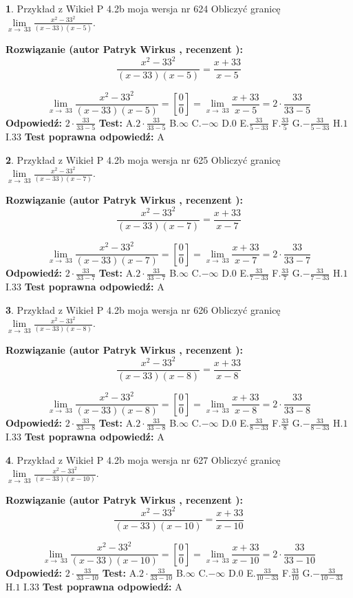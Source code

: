 \documentclass[12pt, a4paper]{article}
\theoremstyle{definition} %
\newtheorem{zad}{}
\newcommand{\zadStart}[1]{\begin{zad}#1\newline}
\newcommand{\zadStop}{\end{zad}}
\newcommand{\rozwStart}[2]{\noindent \textbf{Rozwiązanie (autor #1 , recenzent #2): }\newline}
\newcommand{\rozwStop}{\newline}
\newcommand{\odpStart}{\noindent \textbf{Odpowiedź:}\newline}
\newcommand{\odpStop}{\newline}
\newcommand{\testStart}{\noindent \textbf{Test:}\newline}
\newcommand{\testStop}{\newline}
\newcommand{\kluczStart}{\noindent \textbf{Test poprawna odpowiedź:}\newline}
\newcommand{\kluczStop}{\newline}
\begin{document}
\zadStart{Przykład z Wikieł P 4.2b moja wersja nr 624}
Obliczyć granicę $\lim\limits_{x\to\ 33}\frac{x^{2}-33^{2}}{(x-33)(x-5)}$.
\zadStop
\rozwStart{Patryk Wirkus}{}
$$\frac{x^{2}-33^{2}}{(x-33)(x-5)}=\frac{x+33}{x-5}$$

$$\lim\limits_{x\to\ 33}\frac{x^{2}-33^{2}}{(x-33)(x-5)}=[\frac{0}{0}]=\lim\limits_{x\to\ 33}\frac{x+33}{x-5}=2 \cdot \frac{33}{33-5}$$
\rozwStop
\odpStart
$2 \cdot \frac{33}{33-5}$
\odpStop
\testStart
A.$2 \cdot \frac{33}{33-5}$
B.$\infty$
C.$-\infty$
D.$0$
E.$\frac{33}{5-33}$
F.$\frac{33}{5}$
G.$-\frac{33}{5-33}$
H.$1$
I.$33$
\testStop
\kluczStart
A
\kluczStop



\zadStart{Przykład z Wikieł P 4.2b moja wersja nr 625}
Obliczyć granicę $\lim\limits_{x\to\ 33}\frac{x^{2}-33^{2}}{(x-33)(x-7)}$.
\zadStop
\rozwStart{Patryk Wirkus}{}
$$\frac{x^{2}-33^{2}}{(x-33)(x-7)}=\frac{x+33}{x-7}$$

$$\lim\limits_{x\to\ 33}\frac{x^{2}-33^{2}}{(x-33)(x-7)}=[\frac{0}{0}]=\lim\limits_{x\to\ 33}\frac{x+33}{x-7}=2 \cdot \frac{33}{33-7}$$
\rozwStop
\odpStart
$2 \cdot \frac{33}{33-7}$
\odpStop
\testStart
A.$2 \cdot \frac{33}{33-7}$
B.$\infty$
C.$-\infty$
D.$0$
E.$\frac{33}{7-33}$
F.$\frac{33}{7}$
G.$-\frac{33}{7-33}$
H.$1$
I.$33$
\testStop
\kluczStart
A
\kluczStop



\zadStart{Przykład z Wikieł P 4.2b moja wersja nr 626}
Obliczyć granicę $\lim\limits_{x\to\ 33}\frac{x^{2}-33^{2}}{(x-33)(x-8)}$.
\zadStop
\rozwStart{Patryk Wirkus}{}
$$\frac{x^{2}-33^{2}}{(x-33)(x-8)}=\frac{x+33}{x-8}$$

$$\lim\limits_{x\to\ 33}\frac{x^{2}-33^{2}}{(x-33)(x-8)}=[\frac{0}{0}]=\lim\limits_{x\to\ 33}\frac{x+33}{x-8}=2 \cdot \frac{33}{33-8}$$
\rozwStop
\odpStart
$2 \cdot \frac{33}{33-8}$
\odpStop
\testStart
A.$2 \cdot \frac{33}{33-8}$
B.$\infty$
C.$-\infty$
D.$0$
E.$\frac{33}{8-33}$
F.$\frac{33}{8}$
G.$-\frac{33}{8-33}$
H.$1$
I.$33$
\testStop
\kluczStart
A
\kluczStop



\zadStart{Przykład z Wikieł P 4.2b moja wersja nr 627}
Obliczyć granicę $\lim\limits_{x\to\ 33}\frac{x^{2}-33^{2}}{(x-33)(x-10)}$.
\zadStop
\rozwStart{Patryk Wirkus}{}
$$\frac{x^{2}-33^{2}}{(x-33)(x-10)}=\frac{x+33}{x-10}$$

$$\lim\limits_{x\to\ 33}\frac{x^{2}-33^{2}}{(x-33)(x-10)}=[\frac{0}{0}]=\lim\limits_{x\to\ 33}\frac{x+33}{x-10}=2 \cdot \frac{33}{33-10}$$
\rozwStop
\odpStart
$2 \cdot \frac{33}{33-10}$
\odpStop
\testStart
A.$2 \cdot \frac{33}{33-10}$
B.$\infty$
C.$-\infty$
D.$0$
E.$\frac{33}{10-33}$
F.$\frac{33}{10}$
G.$-\frac{33}{10-33}$
H.$1$
I.$33$
\testStop
\kluczStart
A
\kluczStop
\end{document}
